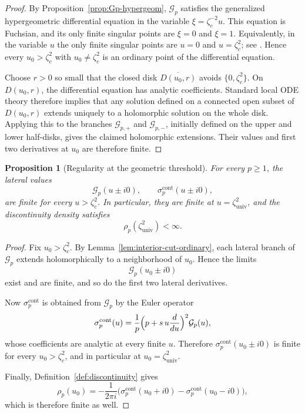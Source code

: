 \documentclass[11pt]{amsart}
\numberwithin{equation}{section}
\theoremstyle{plain}
\newtheorem{proposition}[theorem]{Proposition}
\theoremstyle{definition}
\theoremstyle{remark}
\begin{document}
\begin{proof}
	By Proposition~\ref{prop:Gp-hypergeom}, \(\mathcal G_p\) satisfies the
	generalized hypergeometric differential equation in the variable
	\(\xi=\zeta_c^{-2}u\). This equation is Fuchsian, and its only finite
	singular points are \(\xi=0\) and \(\xi=1\). Equivalently, in the variable
	\(u\) the only finite singular points are \(u=0\) and \(u=\zeta_c^2\); see
	\cite[\S16.8,\S16.11]{NIST:DLMF}. Hence every \(u_0>\zeta_c^2\) with
	\(u_0\neq \zeta_c^2\) is an ordinary point of the differential equation.

	Choose \(r>0\) so small that the closed disk \(\overline{D(u_0,r)}\) avoids
	\(\{0,\zeta_c^2\}\). On \(D(u_0,r)\), the differential equation has analytic
	coefficients. Standard local ODE theory therefore implies that any solution
	defined on a connected open subset of \(D(u_0,r)\) extends uniquely to a
	holomorphic solution on the whole disk. Applying this to the branches
	\(\mathcal G_{p,+}\) and \(\mathcal G_{p,-}\), initially defined on the
	upper and lower half-disks, gives the claimed holomorphic extensions. Their
	values and first two derivatives at \(u_0\) are therefore finite.
\end{proof}

\begin{proposition}[Regularity at the geometric threshold]
	\label{prop:univ-regularity}
	For every \(p\ge1\), the lateral values
	\[
		\mathcal G_p(u\pm i0),
		\qquad
		\sigma_p^{\mathrm{cont}}(u\pm i0),
	\]
	are finite for every \(u>\zeta_c^2\). In particular, they are finite at $u=\zeta_{\mathrm{univ}}^2$,
	and the discontinuity density satisfies
	\[
		\rho_p(\zeta_{\mathrm{univ}}^2)<\infty.
	\]
\end{proposition}

\begin{proof}
	Fix \(u_0>\zeta_c^2\). By Lemma~\ref{lem:interior-cut-ordinary}, each lateral
	branch of \(\mathcal G_p\) extends holomorphically to a neighborhood of
	\(u_0\). Hence the limits
	\[
		\mathcal G_p(u_0\pm i0)
	\]
	exist and are finite, and so do the first two lateral derivatives.

	Now \(\sigma_p^{\mathrm{cont}}\) is obtained from \(\mathcal G_p\) by the Euler
	operator
	\[
		\sigma_p^{\mathrm{cont}}(u)
		=
		\frac1p\Bigl(p+s\,u\frac{d}{du}\Bigr)^2\mathcal G_p(u),
	\]
	whose coefficients are analytic at every finite \(u\). Therefore
	\(\sigma_p^{\mathrm{cont}}(u_0\pm i0)\) is finite for every \(u_0>\zeta_c^2\),
	and in particular at \(u_0=\zeta_{\mathrm{univ}}^2\).

	Finally, Definition~\ref{def:discontinuity} gives
	\[
		\rho_p(u_0)
		=
		-\frac{1}{2\pi i}
		\bigl(
		\sigma_p^{\mathrm{cont}}(u_0+i0)-\sigma_p^{\mathrm{cont}}(u_0-i0)
		\bigr),
	\]
	which is therefore finite as well.\end{proof}
\end{document}
